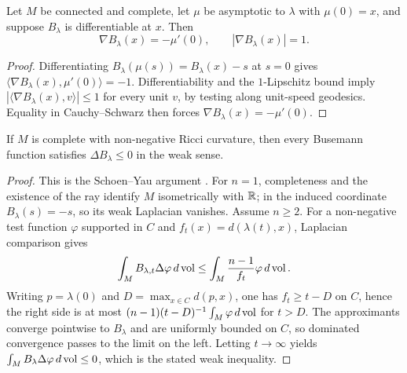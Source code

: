 \begin{lemma}
\label{lem:busemann-gradient-norm-one}

Let $M$ be connected and complete, let $\mu$ be asymptotic to $\lambda$
with $\mu(0)=x$, and suppose $B_\lambda$ is differentiable at $x$. Then
$$\nabla B_\lambda(x)=-\mu'(0),\qquad |\nabla B_\lambda(x)|=1.$$
\label{eqnBlipgrad}
\end{lemma}
\begin{proof}
\sketch
{}
Differentiating $B_\lambda(\mu(s))=B_\lambda(x)-s$ at $s=0$ gives
$\langle\nabla B_\lambda(x),\mu'(0)\rangle=-1$. Differentiability and
the $1$-Lipschitz bound imply
$|\langle\nabla B_\lambda(x),v\rangle|\le1$ for every unit $v$, by
testing along unit-speed geodesics. Equality in Cauchy--Schwarz then
forces $\nabla B_\lambda(x)=-\mu'(0)$.
\end{proof}

\begin{proposition}
\label{prop:busemann-laplacian}
\label{Blambda}


If $M$ is complete with non-negative Ricci curvature, then every
Busemann function satisfies $\Delta B_\lambda\le0$ in the weak sense.
\end{proposition}
\begin{proof}
\sketch
{}
This is the Schoen--Yau argument \cite{SchoenYau}.
For $n=1$, completeness and the existence of the ray identify $M$
isometrically with $\mathbb{R}$; in the induced coordinate
$B_\lambda(s)=-s$, so its weak Laplacian vanishes. Assume $n\ge2$.
For a non-negative test function $\varphi$ supported in $C$ and
$f_t(x)=d(\lambda(t),x)$, Laplacian comparison gives
$$\int_M B_{\lambda,t}\Delta\varphi\,d\operatorname{vol}
\le\int_M\frac{n-1}{f_t}\varphi\,d\operatorname{vol}.$$
Writing $p=\lambda(0)$ and
$D=\max_{x\in C}d(p,x)$, one has $f_t\ge t-D$ on $C$, hence the
right side is at most
$(n-1)(t-D)^{-1}\int_M\varphi\,d\operatorname{vol}$ for $t>D$. The approximants
converge pointwise to $B_\lambda$ and are uniformly bounded on $C$, so
dominated convergence passes to the limit on the left. Letting
$t\to\infty$ yields
$\int_M B_\lambda\Delta\varphi\,d\operatorname{vol}\le0$, which is the stated weak
inequality.
\end{proof}

